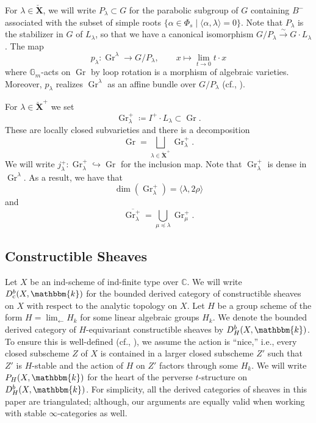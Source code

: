 \documentclass{amsart}
\newcommand{\C}{\mathbb{C}}
\newcommand{\G}{\mathbb{G}}
\renewcommand{\k}{\mathbbm{k}}
\newcommand{\bfXv}{\check{\mathbf{X}}}
\DeclareMathOperator{\cons}{c}
\DeclareMathOperator{\Gr}{Gr}
\newcommand{\ilim}{\lim_{\leftarrow}}
\theoremstyle{definition}
\begin{document}
    For $\lambda \in \bfXv$, we will write $P_{\lambda} \subset G$ for the parabolic subgroup of $G$ containing $B^{-}$ associated with the subset of simple roots $\{ \alpha \in \Phi_s \mid \langle \alpha, \lambda \rangle = 0\}$.
    Note that $P_{\lambda}$ is the stabilizer in $G$ of $L_{\lambda}$, so that we have a canonical isomorphism $G/P_{\lambda} \stackrel{\sim}{\to} G \cdot L_{\lambda}$.
    The map
    \[p_{\lambda} : \Gr^{\lambda} \to G/P_{\lambda}, \qquad x \mapsto \lim_{t \to 0} t \cdot x\]
    where $\G_m$-acts on $\Gr$ by loop rotation is a morphism of algebraic varieties. Moreover, $p_{\lambda}$ realizes $\Gr^{\lambda}$ as an affine bundle over $G/P_{\lambda}$ (cf., \cite[Lemme 2.3]{NP}). 

    For $\lambda \in \bfXv^{+}$ we set
    \[\Gr_{\lambda}^{+} \coloneq I^+ \cdot L_{\lambda} \subset \Gr.\]
    These are locally closed subvarieties and there is a decomposition
    \[\Gr = \bigsqcup_{\lambda \in \bfXv^{+}} \Gr_{\lambda}^{+}.\]
    We will write $j_{\lambda}^{+} : \Gr_{\lambda}^{+} \hookrightarrow \Gr$ for the inclusion map. Note that $\Gr_{\lambda}^+$ is dense in $\Gr^{\lambda}$. As a result, we have that 
    \[\dim (\Gr_{\lambda}^+) = \langle \lambda, 2\rho \rangle\]
    and 
    \[\overline{\Gr_{\lambda}^+} = \bigcup_{\mu \preceq \lambda} \Gr_{\mu}^+. \]

    \subsection{Constructible Sheaves}

   Let $X$ be an ind-scheme of ind-finite type over $\C$.
   We will write $D_{\cons}^b (X, \k)$ for the bounded derived category of constructible sheaves on $X$ with respect to the analytic topology on $X$.
    Let $H$ be a group scheme of the form $H = \ilim H_k$ for some linear algebraic groups $H_k$.
    We denote the bounded derived category of $H$-equivariant constructible sheaves by $D_H^b (X, \k)$. 
    To ensure this is well-defined (cf., \cite{Ga01}), we assume the action is ``nice,'' i.e., every closed subscheme $Z$ of $X$ is contained in a larger closed subscheme $Z'$ such that $Z'$ is $H$-stable and the action of $H$ on $Z'$ factors through some $H_k$.
    We will write $P_H (X, \k)$ for the heart of the perverse $t$-structure on $D_H^b (X, \k)$. 
    For simplicity, all the derived categories of sheaves in this paper are triangulated; although, our arguments are equally valid when working with stable $\infty$-categories as well.
\end{document}
